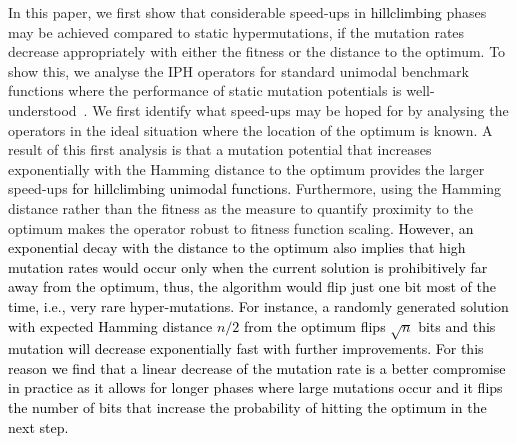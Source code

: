 \documentclass[lettersize,journal]{IEEEtran}
\newcommand{\new}[1]{\textcolor{black}{#1}}
\newcommand{\rev}[1]{\textcolor{black}{#1}}
\begin{document}
In this paper, we first show that considerable speed-ups in \new{hillclimbing} phases may be achieved compared to static hypermutations, 
if the mutation rates decrease appropriately with either the fitness or the distance to the optimum. 
To show this, we analyse the IPH operators for standard unimodal benchmark functions where the performance of static mutation potentials is well-understood~\cite{CorusOlivetoYazdani2019TCS}.
We first identify what speed-ups may be hoped for by analysing the operators in the ideal situation where the location of the optimum is known.
A result of this first analysis is that a mutation potential that increases exponentially with the Hamming distance to the optimum provides the larger speed-ups \new{for hillclimbing unimodal functions}. Furthermore, using the Hamming distance rather than the fitness as the measure to quantify proximity to the optimum
makes the operator robust to fitness function scaling.
\new{However, an exponential decay with the distance to the optimum also implies that high mutation rates would occur only when the current solution is prohibitively far away from the optimum, \rev{thus, the algorithm would flip just one bit most of the time, i.e., very rare hyper-mutations}. For instance, a randomly generated solution with expected Hamming distance $n/2$ from the optimum flips $\sqrt{n}$ bits and this mutation will decrease exponentially fast with further improvements. For this reason we find that a linear decrease of the mutation rate is a better compromise in \rev{practice} as it allows for longer phases where large mutations occur} \textcolor{black}{ and it flips the number of bits that increase the probability of hitting the optimum in the next step.}
\end{document}
